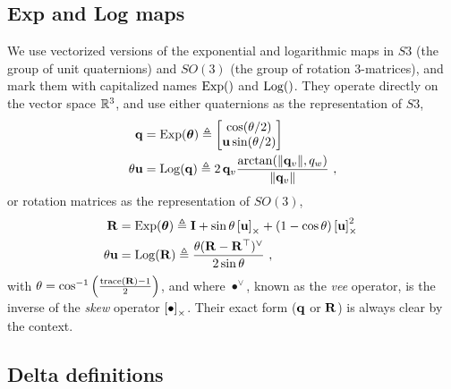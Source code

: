 \subsection{Exp and Log maps}

We use vectorized versions of the exponential and logarithmic maps in $S3$ (the group of unit quaternions) and $SO(3)$ (the group of rotation 3-matrices), and mark them with capitalized names $\operatorname*{Exp}()$ and $\operatorname*{Log}()$. They operate directly on the vector space ${\mathbb R}^3$, and use either quaternions as the representation of $S3$,
%
\begin{subequations}
\begin{align}
{\bf q}
&= \operatorname*{Exp}({{\bm \theta}}) \triangleq \begin{bmatrix}
\cos(\theta/2) \\ {\bf u}\sin(\theta/2)
\end{bmatrix}\\ 
\theta{\bf u} &= \operatorname*{Log}({\bf q}) \triangleq 2\,{{\bf q}_v}\frac{\arctan({{\left\|{{\bf q}_v}\right\|},q_w})}{{\left\|{{\bf q}_v}\right\|}}
~,
\end{align}
\end{subequations}
%
or rotation matrices as the representation of $SO(3)$, 
%
\begin{subequations}
\begin{align}
{\bf R}
&= \operatorname*{Exp}({{\bm \theta}}) \triangleq {\bf I} + \sin\theta\left[{\bf u}\right]_\times + (1-\cos\theta)\left[{\bf u}\right]_\times^2~ \label{equ:rodrigues} \\ 
\theta{\bf u} &= \operatorname*{Log}({\bf R}) \triangleq \frac{\theta({\bf R}-{\bf R}^{\top})^\vee}{2\sin\theta} 
~,
\end{align}
\end{subequations}
%
with $\theta=\cos^{-1}\left(\frac{\operatorname*{trace}({\bf R})-1}{2}\right)$,
and where $\bullet^\vee$, known as the \emph{vee} operator, is the inverse of the \emph{skew} operator $\left[\bullet\right]_\times$. 
Their exact form (${\bf q}$ or ${\bf R}$) is always clear by the context.





\subsection{Delta definitions}

